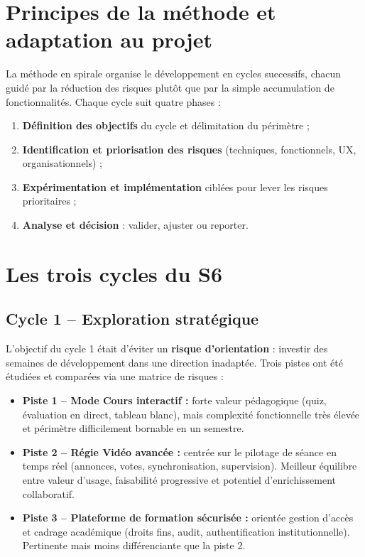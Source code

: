 \documentclass[11pt,a4paper]{report}
\begin{document}
\section{Principes de la méthode et adaptation au projet}

La méthode en spirale organise le développement en cycles successifs, chacun guidé par la réduction des risques plutôt que par la simple accumulation de fonctionnalités. Chaque cycle suit quatre phases :

\begin{enumerate}
    \item \textbf{Définition des objectifs} du cycle et délimitation du périmètre ;
    \item \textbf{Identification et priorisation des risques} (techniques, fonctionnels, UX, organisationnels) ;
    \item \textbf{Expérimentation et implémentation} ciblées pour lever les risques prioritaires ;
    \item \textbf{Analyse et décision} : valider, ajuster ou reporter.
\end{enumerate}

\section{Les trois cycles du S6}

\subsection{Cycle 1 -- Exploration stratégique}

L'objectif du cycle 1 était d'éviter un \textbf{risque d'orientation} : investir des semaines de développement dans une direction inadaptée. Trois pistes ont été étudiées et comparées via une matrice de risques :

\begin{itemize}
    \item \textbf{Piste 1 -- Mode Cours interactif :} forte valeur pédagogique (quiz, évaluation en direct, tableau blanc), mais complexité fonctionnelle très élevée et périmètre difficilement bornable en un semestre.
    \item \textbf{Piste 2 -- Régie Vidéo avancée :} centrée sur le pilotage de séance en temps réel (annonces, votes, synchronisation, supervision). Meilleur équilibre entre valeur d'usage, faisabilité progressive et potentiel d'enrichissement collaboratif.
    \item \textbf{Piste 3 -- Plateforme de formation sécurisée :} orientée gestion d'accès et cadrage académique (droits fins, audit, authentification institutionnelle). Pertinente mais moins différenciante que la piste 2.
\end{itemize}
\end{document}
